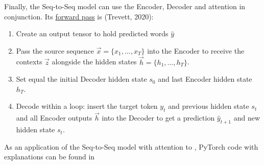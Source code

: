 Finally, the Seq-to-Seq model can use the Encoder, Decoder and attention in conjunction. Its \hyperref[sec:ForwardProp]{forward pass} is (Trevett, 2020): 
\begin{enumerate}
    \item Create an output tensor to hold predicted words $\hat{y}$
    
    \item Pass the source sequence $\overrightarrow{x} = \Big \{ x_1, ..., x_T \Big \}$ into the Encoder to receive the contexts $\overrightarrow{z}$ alongside the hidden states $\overrightarrow{h} = \Big \{ h_1, ..., h_T \Big \}$.
    
    \item Set equal the initial Decoder hidden state $s_0$ and last Encoder hidden state $h_T$.
    
    \item Decode within a loop: insert the target token $y_t$ and previous hidden state $s_t$ and all Encoder outputs $\overrightarrow{h}$ into the Decoder to get a prediction $\hat{y}_{t+1}$ and new hidden state $s_t$.
    
    
\end{enumerate}

As an application of the Seq-to-Seq model with attention to , PyTorch code with explanations can be found in 
